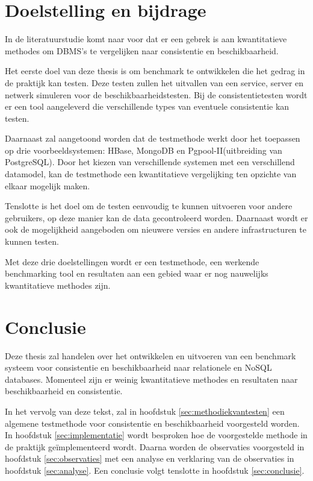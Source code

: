 \section{Doelstelling en bijdrage}
In de literatuurstudie komt naar voor dat er een gebrek is aan kwantitatieve methodes om DBMS's te vergelijken naar consistentie en beschikbaarheid. 

Het eerste doel van deze thesis is om benchmark te ontwikkelen die het gedrag in de praktijk kan testen. Deze testen zullen het uitvallen van een service, server en netwerk simuleren voor de beschikbaarheidstesten. Bij de consistentietesten wordt er een tool aangeleverd die verschillende types van eventuele consistentie kan testen. 

Daarnaast zal aangetoond worden dat de testmethode werkt door het toepassen op drie voorbeeldsystemen: HBase, MongoDB en Pgpool-II(uitbreiding van PostgreSQL). Door het kiezen van verschillende systemen met een verschillend datamodel, kan de testmethode een kwantitatieve vergelijking ten opzichte van elkaar mogelijk maken. 

Tenslotte is het doel om de testen eenvoudig te kunnen uitvoeren voor andere gebruikers, op deze manier kan de data gecontroleerd worden. Daarnaast wordt er ook de mogelijkheid aangeboden om nieuwere versies en andere infrastructuren te kunnen testen.

Met deze drie doelstellingen wordt er een testmethode, een werkende benchmarking tool en resultaten aan een gebied waar er nog nauwelijks kwantitatieve methodes zijn. 

\section{Conclusie}
Deze thesis zal handelen over het ontwikkelen en uitvoeren van een benchmark systeem voor consistentie en beschikbaarheid naar relationele en NoSQL databases. Momenteel zijn er weinig kwantitatieve methodes en resultaten naar beschikbaarheid en consistentie.  

In het vervolg van deze tekst, zal in hoofdstuk \ref{sec:methodiekvantesten} een algemene testmethode voor consistentie en beschikbaarheid voorgesteld worden. In hoofdstuk \ref{sec:implementatie} wordt besproken hoe de voorgestelde methode in de praktijk geïmplementeerd wordt. Daarna worden de observaties voorgesteld in hoofdstuk \ref{sec:observaties} met een analyse en verklaring van de observaties in hoofdstuk \ref{sec:analyse}. Een conclusie volgt tenslotte in hoofdstuk \ref{sec:conclusie}. 